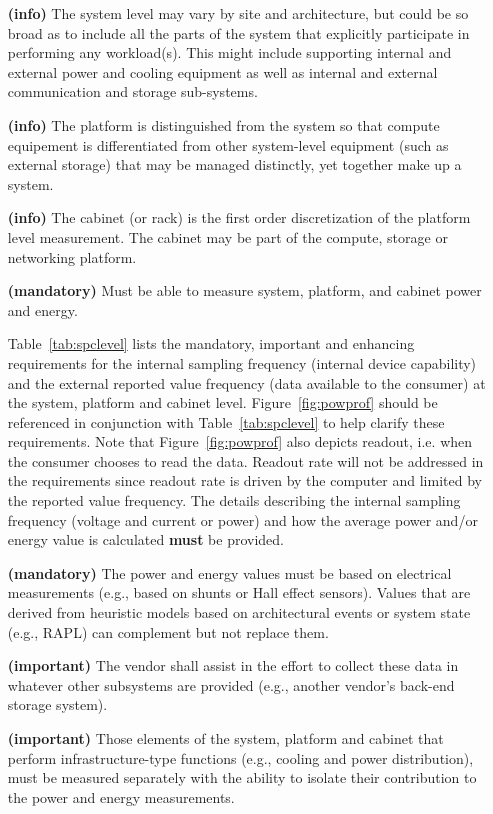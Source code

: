 \begin{itemize}
\item[\textbf{(info)}]
The system level may vary by site and architecture, but could be so broad as to 
include all the parts of the system that explicitly participate in performing 
any workload(s). This might include supporting internal and external power and 
cooling equipment as well as internal and external communication and storage sub-systems. 

\item[\textbf{(info)}]
The platform is distinguished from the system so 
that compute equipement is differentiated from 
other system-level equipment (such as external storage) that may be managed distinctly,
yet together make up a system. 

\item[\textbf{(info)}]
The cabinet (or rack) is the first order discretization of the platform 
level measurement. The cabinet may be part of the compute, storage or networking platform. 

\item[\textbf{(mandatory)}]
Must be able to measure system, platform, and cabinet power and energy.

Table~\ref{tab:spclevel} lists the mandatory, important and enhancing requirements for 
the internal sampling frequency (internal device capability) and the external reported 
value frequency (data available to the consumer) at the system, platform and cabinet level. 
Figure~\ref{fig:powprof} should be referenced in conjunction with Table~\ref{tab:spclevel} to 
help clarify these requirements. Note that Figure~\ref{fig:powprof} also depicts readout, 
i.e. when the consumer chooses to read the data. Readout rate will not be addressed in 
the requirements since readout rate is driven by the computer and limited by the reported 
value frequency. The details describing the internal sampling frequency (voltage and 
current or power) and how the average power and/or energy value is calculated \textbf{must} be provided.

\item[\textbf{(mandatory)}]
The power and energy values must be based on electrical measurements 
(e.g., based on shunts or Hall effect sensors). Values that are derived from 
heuristic models based on architectural events or system state (e.g., RAPL) can 
complement but not replace them.

\item[\textbf{(important)}]
The vendor shall assist in the effort to collect these data in whatever other 
subsystems are provided (e.g., another vendor’s back-end storage system). 

\item[\textbf{(important)}]
Those elements of the system, platform and cabinet that perform infrastructure-type 
functions (e.g., cooling and power distribution), must be measured separately with the 
ability to isolate their contribution to the power and energy measurements.  

\end{itemize}

